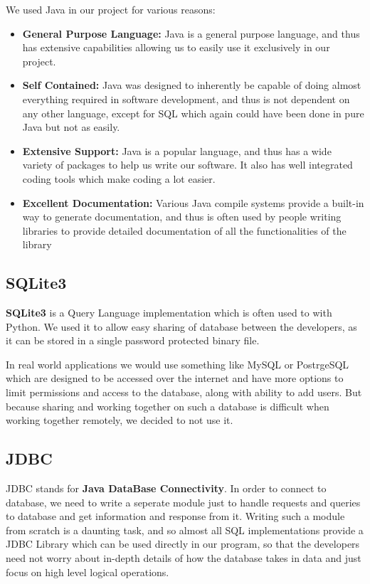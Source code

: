\documentclass[12pt, a4paper]{article}
\begin{document}
We used Java in our project for various reasons:
\begin{itemize}

	\item \textbf{General Purpose Language:} Java is a general purpose language, and thus has extensive capabilities allowing us to easily use it exclusively in our project.
	\item \textbf{Self Contained:} Java was designed to inherently be capable of doing almost everything required in software development, and thus is not dependent on any other language, except for SQL which again could have been done in pure Java but not as easily.
	\item \textbf{Extensive Support:} Java is a popular language, and thus has a wide variety of packages to help us write our software. It also has well integrated coding tools which make coding a lot easier.
	\item \textbf{Excellent Documentation:} Various Java compile systems provide a built-in way to generate documentation, and thus is often used by people writing libraries to provide detailed documentation of all the functionalities of the library

\end{itemize}

\subsection*{SQLite3}

\textbf{SQLite3} is a Query Language implementation which is often used to with Python. We used it to allow easy sharing of database between the developers, as it can be stored in a single password protected binary file.

In real world applications we would use something like MySQL or PostrgeSQL which are designed to be accessed over the internet and have more options to limit permissions and access to the database, along with ability to add users. But because sharing and working together on such a database is difficult when working together remotely, we decided to not use it.

\subsection*{JDBC}

JDBC stands for \textbf{Java DataBase Connectivity}. In order to connect to database, we need to write a seperate module just to handle requests and queries to database and get information and response from it. Writing such a module from scratch is a daunting task, and so almost all SQL implementations provide a JDBC Library which can be used directly in our program, so that the developers need not worry about in-depth details of how the database takes in data and just focus on high level logical operations.
\end{document}
